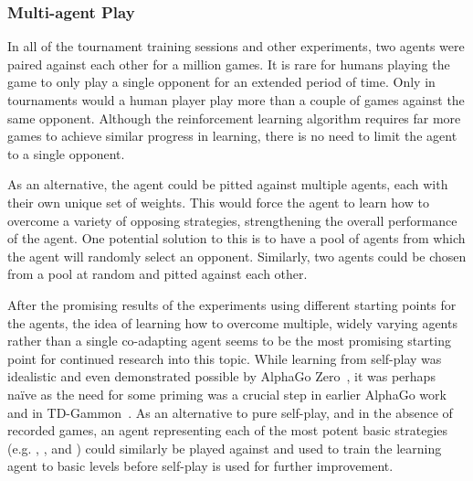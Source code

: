 
\subsubsection*{Multi-agent Play}
\label{sec:disc-future-rr}


In all of the tournament training sessions and other experiments,
two agents were paired against each other for a million games.
%
%
It is rare for humans playing the game to only play a single opponent
for an extended period of time.
%
Only in tournaments would a human player play more than a couple of games
against the same opponent.
%
Although the reinforcement learning algorithm requires far more games to
achieve similar progress in learning,
there is no need to limit the agent to a single opponent.

As an alternative,
the agent could be pitted against multiple agents,
each with their own unique set of
weights.
%
This would force the agent to learn how to overcome a variety of opposing
strategies,
strengthening the overall performance of the agent.
%
One potential solution to this is to have a pool of agents
from which the agent will randomly select an opponent.
%
Similarly,
two agents could be chosen from a pool at random and pitted against each
other.

After the promising results of the experiments using different starting points
for the agents,
the idea of learning how to overcome multiple, widely varying agents
rather than a single co-adapting agent
seems to be the most promising starting point for continued research into this
topic.
%
While learning from self-play was idealistic
and even demonstrated possible by AlphaGo Zero~\cite{deepmind_alphago_zero},
it was perhaps naïve as
the need for some priming was a crucial step in earlier AlphaGo
work~\cite{deepmind_alphago} and in TD-Gammon~\cite{tdgammon}.
%
As an alternative to pure self-play,
and in the absence of recorded games,
an agent representing each of the most potent basic strategies
(e.g. \handmaxavg, \handmaxmin, and \handmaxposs)
could similarly be played against and used to train the learning agent
to basic levels before self-play is used for further improvement.

